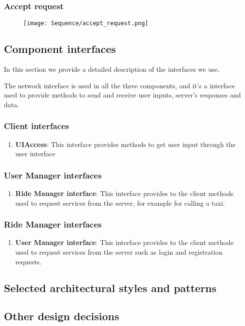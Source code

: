 	\subsubsection{Accept request}
	\begin{figure}[h!]
		\centering
		\texttt{[image: Sequence/accept\_request.png]}
	\end{figure}
	\newpage		


\subsection{Component interfaces}
In this section we provide a detailed description of the interfaces we use.

The network interface is used in all the three components, and it's a interface used to provide methods to send and receive user inputs, server's responses and data.
\subsubsection{Client interfaces}
\begin{enumerate}
	\item \textbf{UIAccess}: This interface provides methods to get user input through the user interface
\end{enumerate}
\subsubsection{User Manager interfaces}
\begin{enumerate}
	\item \textbf{Ride Manager interface}: This interface provides to the client methods used to request services from the server, for example for calling a taxi.
\end{enumerate}
\subsubsection{Ride Manager interfaces}
	\begin{enumerate}
		\item \textbf{User Manager interface}: This interface provides to the client methods used to request services from the server such as login and registration requests.
	\end{enumerate}
	
\subsection{Selected architectural styles and patterns}

\subsection{Other design decisions}